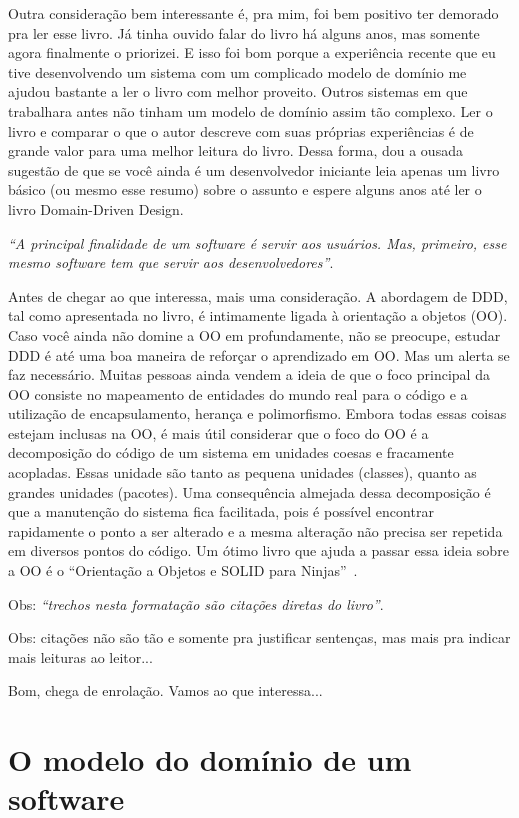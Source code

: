 \documentclass[a4paper, 12pt]{article}
\newcommand{\citacao}[1]{\emph{``#1''}}
\begin{document}
Outra consideração bem interessante é, pra mim, foi bem positivo ter demorado pra ler esse livro. Já tinha ouvido falar do livro há alguns anos, mas somente agora finalmente o priorizei. E isso foi bom porque a experiência recente que eu tive desenvolvendo um sistema com um complicado modelo de domínio me ajudou bastante a ler o livro com melhor proveito. Outros sistemas em que trabalhara antes não tinham um modelo de domínio assim tão complexo. Ler o livro e comparar o que o autor descreve com suas próprias experiências é de grande valor para uma melhor leitura do livro. Dessa forma, dou a ousada sugestão de que se você ainda é um desenvolvedor iniciante leia apenas um livro básico (ou mesmo esse resumo) sobre o assunto e espere alguns anos até ler o livro Domain-Driven Design.

\citacao{A principal finalidade de um software é servir aos usuários. Mas, primeiro, esse mesmo software tem que servir aos desenvolvedores}.

Antes de chegar ao que interessa, mais uma consideração. A abordagem de DDD, tal como apresentada no livro, é intimamente ligada à orientação a objetos (OO). Caso você ainda não domine a OO em profundamente, não se preocupe, estudar DDD é até uma boa maneira de reforçar o aprendizado em OO. Mas um alerta se faz necessário. Muitas pessoas ainda vendem a ideia de que o foco principal da OO consiste no mapeamento de entidades do mundo real para o código e a utilização de encapsulamento, herança e polimorfismo. Embora todas essas coisas estejam inclusas na OO, é mais útil considerar que o foco do OO é a decomposição do código de um sistema em unidades coesas e fracamente acopladas. Essas unidade são tanto as pequena unidades (classes), quanto as grandes unidades (pacotes). Uma consequência almejada dessa decomposição é que a manutenção do sistema fica facilitada, pois é possível encontrar rapidamente o ponto a ser alterado e a mesma alteração não precisa ser repetida em diversos pontos do código. Um ótimo livro que ajuda a passar essa ideia sobre a OO é o ``Orientação a Objetos e SOLID para Ninjas''~\cite{Aniche2015Ninjas}.

Obs: \citacao{trechos nesta formatação são citações diretas do livro}.

Obs: citações não são tão e somente pra justificar sentenças, mas mais pra indicar mais leituras ao leitor...

Bom, chega de enrolação. Vamos ao que interessa...

\section{O modelo do domínio de um software}
\end{document}

